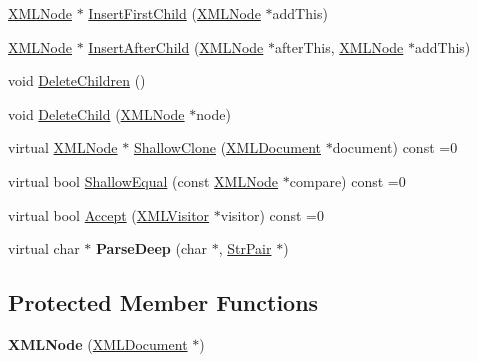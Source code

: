 \begin{DoxyCompactItemize}
\item 
\hyperlink{classtinyxml2_1_1_x_m_l_node}{X\+M\+L\+Node} $\ast$ \hyperlink{classtinyxml2_1_1_x_m_l_node_a8ff7dc071f3a1a6ae2ac25a37492865d}{Insert\+First\+Child} (\hyperlink{classtinyxml2_1_1_x_m_l_node}{X\+M\+L\+Node} $\ast$add\+This)
\item 
\hyperlink{classtinyxml2_1_1_x_m_l_node}{X\+M\+L\+Node} $\ast$ \hyperlink{classtinyxml2_1_1_x_m_l_node_a85adb8f0b7477eec30f9a41d420b09c2}{Insert\+After\+Child} (\hyperlink{classtinyxml2_1_1_x_m_l_node}{X\+M\+L\+Node} $\ast$after\+This, \hyperlink{classtinyxml2_1_1_x_m_l_node}{X\+M\+L\+Node} $\ast$add\+This)
\item 
void \hyperlink{classtinyxml2_1_1_x_m_l_node_a0360085cc54df5bff85d5c5da13afdce}{Delete\+Children} ()
\item 
void \hyperlink{classtinyxml2_1_1_x_m_l_node_a363b6edbd6ebd55f8387d2b89f2b0921}{Delete\+Child} (\hyperlink{classtinyxml2_1_1_x_m_l_node}{X\+M\+L\+Node} $\ast$node)
\item 
virtual \hyperlink{classtinyxml2_1_1_x_m_l_node}{X\+M\+L\+Node} $\ast$ \hyperlink{classtinyxml2_1_1_x_m_l_node_a83e3524e2ecea25eeab630c7ab113627}{Shallow\+Clone} (\hyperlink{classtinyxml2_1_1_x_m_l_document}{X\+M\+L\+Document} $\ast$document) const  =0
\item 
virtual bool \hyperlink{classtinyxml2_1_1_x_m_l_node_ac50408e91e095237f45716092ac2bddc}{Shallow\+Equal} (const \hyperlink{classtinyxml2_1_1_x_m_l_node}{X\+M\+L\+Node} $\ast$compare) const  =0
\item 
virtual bool \hyperlink{classtinyxml2_1_1_x_m_l_node_a366ad0e9b9ae8d1b18c00f903994b7a9}{Accept} (\hyperlink{classtinyxml2_1_1_x_m_l_visitor}{X\+M\+L\+Visitor} $\ast$visitor) const  =0
\item 
virtual char $\ast$ {\bfseries Parse\+Deep} (char $\ast$, \hyperlink{classtinyxml2_1_1_str_pair}{Str\+Pair} $\ast$)\hypertarget{classtinyxml2_1_1_x_m_l_node_a8263ad55d894578e8e72a65c56649138}{}\label{classtinyxml2_1_1_x_m_l_node_a8263ad55d894578e8e72a65c56649138}

\end{DoxyCompactItemize}
\subsection*{Protected Member Functions}
\begin{DoxyCompactItemize}
\item 
{\bfseries X\+M\+L\+Node} (\hyperlink{classtinyxml2_1_1_x_m_l_document}{X\+M\+L\+Document} $\ast$)\hypertarget{classtinyxml2_1_1_x_m_l_node_a29868df6ca383d574f584dfdd15105b6}{}\label{classtinyxml2_1_1_x_m_l_node_a29868df6ca383d574f584dfdd15105b6}

\end{DoxyCompactItemize}
